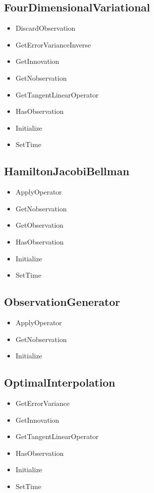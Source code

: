 \documentclass{tufte-book}
\begin{document}
\subsection{FourDimensionalVariational}

\begin{itemize}
\item DiscardObservation
\item GetErrorVarianceInverse
\item GetInnovation
\item GetNobservation
\item GetTangentLinearOperator
\item HasObservation
\item Initialize
\item SetTime
\end{itemize}

\subsection{HamiltonJacobiBellman}

\begin{itemize}
\item ApplyOperator
\item GetNobservation
\item GetObservation
\item HasObservation
\item Initialize
\item SetTime
\end{itemize}


\subsection{ObservationGenerator}

\begin{itemize}
\item ApplyOperator
\item GetNobservation
\item Initialize
\end{itemize}

\subsection{OptimalInterpolation}

\begin{itemize}
\item GetErrorVariance
\item GetInnovation
\item GetTangentLinearOperator
\item HasObservation
\item Initialize
\item SetTime
\end{itemize}
\end{document}
